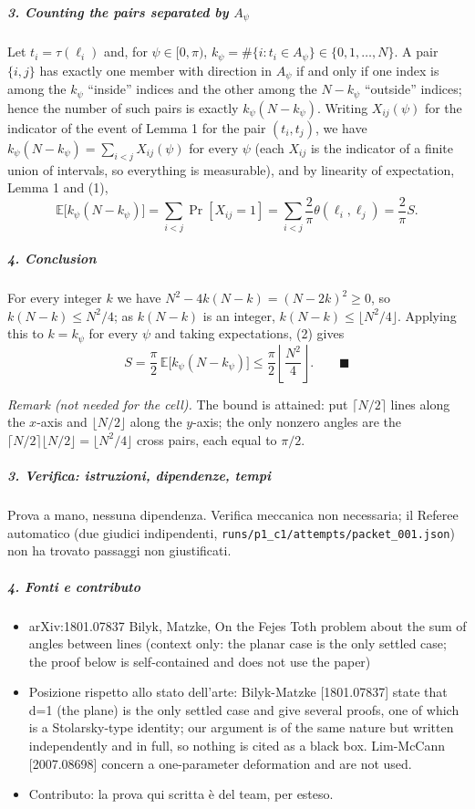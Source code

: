 \documentclass[11pt,a4paper]{article}
\providecommand{\tightlist}{\setlength{\itemsep}{0pt}\setlength{\parskip}{0pt}}
\begin{document}
\subparagraph{\texorpdfstring{3. Counting the pairs separated by
\(A_\psi\)}{3. Counting the pairs separated by A\_\textbackslash psi}}\label{counting-the-pairs-separated-by-a_psi}

Let \(t_i=\tau(\ell_i)\) and, for \(\psi\in[0,\pi)\),
\(k_\psi=\#\{i: t_i\in A_\psi\}\in\{0,1,\dots,N\}\). A pair \(\{i,j\}\)
has exactly one member with direction in \(A_\psi\) if and only if one
index is among the \(k_\psi\) ``inside'' indices and the other among the
\(N-k_\psi\) ``outside'' indices; hence the number of such pairs is
exactly \(k_\psi(N-k_\psi)\). Writing \(X_{ij}(\psi)\) for the indicator
of the event of Lemma 1 for the pair \((t_i,t_j)\), we have
\(k_\psi(N-k_\psi)=\sum_{i<j}X_{ij}(\psi)\) for every \(\psi\) (each
\(X_{ij}\) is the indicator of a finite union of intervals, so
everything is measurable), and by linearity of expectation, Lemma 1 and
(1),
\[\mathbb E\big[k_\psi(N-k_\psi)\big]=\sum_{i<j}\Pr[X_{ij}=1]=\sum_{i<j}\frac{2}{\pi}\theta(\ell_i,\ell_j)=\frac{2}{\pi}S.\tag{2}\]

\subparagraph{4. Conclusion}\label{conclusion}

For every integer \(k\) we have \(N^2-4k(N-k)=(N-2k)^2\ge0\), so
\(k(N-k)\le N^2/4\); as \(k(N-k)\) is an integer,
\(k(N-k)\le\lfloor N^2/4\rfloor\). Applying this to \(k=k_\psi\) for
every \(\psi\) and taking expectations, (2) gives
\[S=\frac{\pi}{2}\,\mathbb E\big[k_\psi(N-k_\psi)\big]\le\frac{\pi}{2}\left\lfloor\frac{N^2}{4}\right\rfloor.\qquad\blacksquare\]

\emph{Remark (not needed for the cell).} The bound is attained: put
\(\lceil N/2\rceil\) lines along the \(x\)-axis and
\(\lfloor N/2\rfloor\) along the \(y\)-axis; the only nonzero angles are
the \(\lceil N/2\rceil\lfloor N/2\rfloor=\lfloor N^2/4\rfloor\) cross
pairs, each equal to \(\pi/2\).

\subparagraph{3. Verifica: istruzioni, dipendenze,
tempi}\label{verifica-istruzioni-dipendenze-tempi}

Prova a mano, nessuna dipendenza. Verifica meccanica non necessaria; il
Referee automatico (due giudici indipendenti,
\texttt{runs/p1\_c1/attempts/packet\_001.json}) non ha trovato passaggi
non giustificati.

\subparagraph{4. Fonti e contributo}\label{fonti-e-contributo}

\begin{itemize}
\tightlist
\item
  arXiv:1801.07837 Bilyk, Matzke, On the Fejes Toth problem about the
  sum of angles between lines (context only: the planar case is the only
  settled case; the proof below is self-contained and does not use the
  paper)
\item
  Posizione rispetto allo stato dell'arte: Bilyk-Matzke {[}1801.07837{]}
  state that d=1 (the plane) is the only settled case and give several
  proofs, one of which is a Stolarsky-type identity; our argument is of
  the same nature but written independently and in full, so nothing is
  cited as a black box. Lim-McCann {[}2007.08698{]} concern a
  one-parameter deformation and are not used.
\item
  Contributo: la prova qui scritta è del team, per esteso.
\end{itemize}
\end{document}
